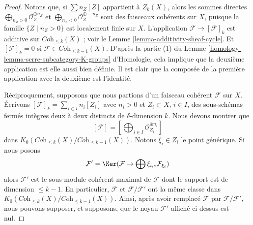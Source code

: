 \begin{proof}
Notons que, si $\sum n_Z[Z]$ appartient à $Z_k(X)$, alors
les sommes directes
$\bigoplus\nolimits_{n_Z > 0} \mathcal{O}_Z^{\oplus n_Z}$ et
$\bigoplus\nolimits_{n_Z < 0} \mathcal{O}_Z^{\oplus -n_Z}$
sont des faisceaux cohérents sur $X$, puisque la famille $\{Z \mid n_Z > 0\}$
est localement finie sur $X$.
L'application $\mathcal{F} \to [\mathcal{F}]_k$ est additive
sur $\textit{Coh}_{\leq k}(X)$ ; voir le
Lemme \ref{lemma-additivity-sheaf-cycle}. Et $[\mathcal{F}]_k = 0$
si $\mathcal{F} \in \textit{Coh}_{\leq k - 1}(X)$. D'après la partie (1)
du Lemme \ref{homology-lemma-serre-subcategory-K-groups} d'Homologie,
cela implique que la deuxième application est elle aussi bien définie.
Il est clair que la composée de la première application avec la deuxième
est l'identité.

\medskip\noindent
Réciproquement, supposons que nous partions d'un faisceau cohérent $\mathcal{F}$
sur $X$. Écrivons $[\mathcal{F}]_k = \sum_{i \in I} n_i[Z_i]$
avec $n_i > 0$ et $Z_i \subset X$, $i \in I$,
des sous-schémas fermés intègres deux à deux distincts de $\delta$-dimension $k$.
Nous devons montrer que
$$
[\mathcal{F}] = [\bigoplus\nolimits_{i \in I} \mathcal{O}_{Z_i}^{\oplus n_i}]
$$
dans $K_0(\textit{Coh}_{\leq k}(X)/\textit{Coh}_{\leq k - 1}(X))$.
Notons $\xi_i \in Z_i$ le point générique.
Si nous posons
$$
\mathcal{F}' = \Ker(\mathcal{F} \to \bigoplus \xi_{i, *}\mathcal{F}_{\xi_i})
$$
alors $\mathcal{F}'$ est le sous-module cohérent maximal de $\mathcal{F}$
dont le support est de dimension $\leq k - 1$. En particulier, $\mathcal{F}$
et $\mathcal{F}/\mathcal{F}'$ ont la même classe dans
$K_0(\textit{Coh}_{\leq k}(X)/\textit{Coh}_{\leq k - 1}(X))$.
Ainsi, après avoir remplacé $\mathcal{F}$ par $\mathcal{F}/\mathcal{F}'$,
nous pouvons supposer, et supposons, que le noyau $\mathcal{F}'$ affiché
ci-dessus est nul.


\end{proof}
